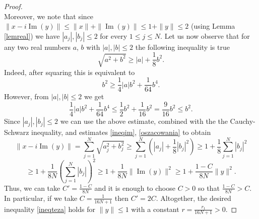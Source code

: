\documentclass[10pt,a4paper]{amsart}
\DeclareMathOperator{\im}{Im}
\begin{document}
\begin{proof}
\begin{equation}
\end{equation}
Moreover, we note that since $\|x-i \im(y)\| \leq \|x\| + \|\im(y)\| \leq 1 + \|y\| \leq 2$ (using Lemma \ref{lemreal}) we have $|a_j|, |b_j| \leq 2$ for every $1 \leq j \leq N$. Let us now observe that for any two real numbers $a$, $b$ with $|a|, |b| \leq 2$ the following inequality is true
$$\sqrt{a^2 + b^2} \geq |a| + \frac{1}{8}b^2.$$
Indeed, after squaring this is equivalent to
$$b^2 \geq \frac{1}{4}|a|b^2 + \frac{1}{64}b^4.$$
However, from $|a|, |b| \leq 2$ we get
$$\frac{1}{4}|a|b^2 + \frac{1}{64}b^4 \leq \frac{1}{2}b^2 + \frac{1}{16}b^2 = \frac{9}{16} b^2 \leq b^2.$$
Since $|a_j|, |b_j| \leq 2$ we can use the above estimate, combined with the the Cauchy-Schwarz inequality, and estimates \eqref{ineqim},  \eqref{oszacowania} to obtain
$$\|x - i\im(y)\| = \sum_{j=1}^{N} \sqrt{a_j^2 + b_j^2} \geq \sum_{j=1}^{N} \left ( |a_j| + \frac{1}{8} |b_j|^2 \right ) \geq 1 + \frac{1}{8} \sum_{j=1}^{N} |b_j|^2$$
$$ \geq 1 + \frac{1}{8N} \left ( \sum_{j=1}^{N} |b_j| \right )^2 \geq 1 + \frac{1}{8N} \|\im(y)\|^2 \geq 1 + \frac{1-C}{8N}\|y\|^2.$$
Thus, we can take $C' = \frac{1-C}{8N}$ and it is enough to choose $C>0$ so that $\frac{1-C}{8N} > C$. In particular, if we take $C=\frac{1}{16N+1}$ then $C'=2C$. Altogether, the desired inequality \eqref{ineqteza} holds for $\|y\| \leq 1$ with a constant $ r = \frac{r_1}{16N+1}>0$.
\end{proof}
\end{document}
